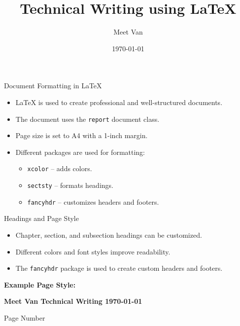 \documentclass{beamer}
\title{Technical Writing using LaTeX}
\author{Meet Van}
\institute{Technical Writing}
\date{\today}
\begin{document}
\begin{frame}
\titlepage
\end{frame}

\begin{frame}{Document Formatting in LaTeX}

\begin{itemize}
\item LaTeX is used to create professional and well-structured documents.
\item The document uses the \texttt{report} document class.
\item Page size is set to A4 with a 1-inch margin.
\item Different packages are used for formatting:
\begin{itemize}
\item \texttt{xcolor} -- adds colors.
\item \texttt{sectsty} -- formats headings.
\item \texttt{fancyhdr} -- customizes headers and footers.
\end{itemize}
\end{itemize}

\end{frame}

\begin{frame}{Headings and Page Style}

\begin{itemize}
\item Chapter, section, and subsection headings can be customized.
\item Different colors and font styles improve readability.
\item The \texttt{fancyhdr} package is used to create custom headers and footers.
\end{itemize}

\vspace{0.3cm}

\textbf{Example Page Style:}

\begin{center}
\textbf{Meet Van \quad Technical Writing \quad \today}

\vspace{0.3cm}
Page Number
\end{center}

\end{frame}
\end{document}
